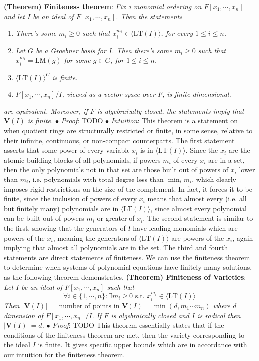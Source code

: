 \documentclass{article}
\newcommand*{\tb}{\textbf}
\newcommand*{\ti}{\textit}
\newcommand*{\n}{\newline}
\newcommand*{\nn}{\newline \newline}
\newcommand*{\Pf}{\indent \ensuremath{\bullet} \textit{Proof}: }
\newcommand*{\In}{\indent \ensuremath{\bullet} \textit{Intuition}: }
\newcommand*{\Fx}{\ensuremath{F[x_1, \cdots, x_n]}}
\newcommand*{\VI}{\ensuremath{\mathbf{V}(I)}}
\begin{document}
\nn
\tb{(Theorem) Finiteness theorem}: \ti{Fix a monomial ordering on $ \Fx $ and let $ I $ be an ideal of $ \Fx $. Then the statements}
\begin{enumerate}
    \item \ti{There's some $ m_i \geq 0 $ such that $ x_i^{m_i} \in \langle \text{LT}(I) \rangle $, for every $ 1 \leq i \leq n $.}
    \item \ti{Let $ G $ be a Groebner basis for $ I $. Then there's some $ m_i \geq 0 $ such that $ x_i^{m_i} = \text{LM}(g) $ for some $ g \in G $, for $ 1 \leq i \leq n $.}
    \item \ti{$ \langle \text{LT}(I) \rangle^C $ is finite.}
    \item \ti{$ \Fx / I $, viewed as a vector space over $ F $, is finite-dimensional.}
\end{enumerate}
\indent \ti{are equivalent. Moreover, if $ F $ is algebraically closed, the statements imply that $ \VI $ is finite.}
\n
\Pf TODO
\n
\In This theorem is a statement on when quotient rings are structurally restricted or finite, in some sense, relative to their infinite, continuous, or non-compact counterparts.
\n
The first statement asserts that some power of every variable $ x_i $ is in $ \langle \text{LT}(I) \rangle $. Since the $ x_i $ are the atomic building blocks of all polynomials, if powers $m_i $ of every $ x_i $ are in a set, then the only polynomials not in that set are those built out of powers of $ x_i $ lower than $ m_i $, i.e. polynomials with total degree less than $ \min_i m_i $, which clearly imposes rigid restrictions on the size of the complement. In fact, it forces it to be finite, since the inclusion of powers of every $ x_i $ means that almost every (i.e. all but finitely many) polynomials are in $ \langle \text{LT}(I) \rangle $, since almost every polynomial can be built out of powers $ m_i $ or greater of $ x_i $.
\n
The second statement is similar to the first, showing that the generators of $ I $ have leading monomials which are powers of the $ x_i $, meaning the generators of $ \langle \text{LT}(I) \rangle $ are powers of the $ x_i $, again implying that almost all polynomials are in the set.
\n
The third and fourth statements are direct statements of finiteness.
\nn
We can use the finiteness theorem to determine when systems of polynomial equations have finitely many solutions, as the following theorem demonstrates.
\nn
\tb{(Theorem) Finiteness of Varieties}: \ti{Let $ I $ be an ideal of $ \Fx $ such that}
$$ \forall i \in \{ 1, \cdots, n \}: \exists m_i \geq 0 \text{ s.t. } x_i^{m_i} \in \langle \text{LT}(I) \rangle $$
\indent \ti{Then $ | \VI | = \text{ number of points in } \VI = \min(d, m_1 \cdots m_n) $ where $ d = $ dimension of $ \Fx / I $. If $ F $ is algebraically closed and $ I $ is radical then $ | \VI | = d $.}
\n
\Pf TODO
\nn
This theorem essentially states that if the conditions of the finiteness theorem are met, then the variety corresponding to the ideal $ I $ is finite. It gives specific upper bounds which are in accordance with our intuition for the finiteness theorem.
\end{document}
